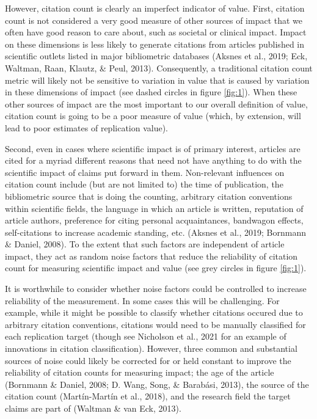 \documentclass[
  english,
  jou,floatsintext]{apa6}
\begin{document}
However, citation count is clearly an imperfect indicator of value. First, citation count is not considered a very good measure of other sources of impact that we often have good reason to care about, such as societal or clinical impact. Impact on these dimensions is less likely to generate citations from articles published in scientific outlets listed in major bibliometric databases (Aksnes et al., 2019; Eck, Waltman, Raan, Klautz, \& Peul, 2013). Consequently, a traditional citation count metric will likely not be sensitive to variation in value that is caused by variation in these dimensions of impact (see dashed circles in figure \ref{fig:1}). When these other sources of impact are the most important to our overall definition of value, citation count is going to be a poor measure of value (which, by extension, will lead to poor estimates of replication value).

Second, even in cases where scientific impact is of primary interest, articles are cited for a myriad different reasons that need not have anything to do with the scientific impact of claims put forward in them. Non-relevant influences on citation count include (but are not limited to) the time of publication, the bibliometric source that is doing the counting, arbitrary citation conventions within scientific fields, the language in which an article is written, reputation of article authors, preference for citing personal acquaintances, bandwagon effects, self-citations to increase academic standing, etc. (Aksnes et al., 2019; Bornmann \& Daniel, 2008). To the extent that such factors are independent of article impact, they act as random noise factors that reduce the reliability of citation count for measuring scientific impact and value (see grey circles in figure \ref{fig:1}).

It is worthwhile to consider whether noise factors could be controlled to increase reliability of the measurement. In some cases this will be challenging. For example, while it might be possible to classify whether citations occured due to arbitrary citation conventions, citations would need to be manually classified for each replication target (though see Nicholson et al., 2021 for an example of innovations in citation classification). However, three common and substantial sources of noise could likely be corrected for or held constant to improve the reliability of citation counts for measuring impact; the age of the article (Bornmann \& Daniel, 2008; D. Wang, Song, \& Barabási, 2013), the source of the citation count (Martín-Martín et al., 2018), and the research field the target claims are part of (Waltman \& van Eck, 2013).
\end{document}
